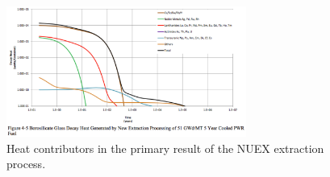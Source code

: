 \begin{figure}[htbp!]
  \begin{center}
    \includegraphics[width=0.7\textwidth]{./images/carter_nuex_heat.eps}
  \end{center}
  \caption{Heat contributors in the primary result of the NUEX extraction 
    process\cite{carter_us_2011}.}
  \label{fig:carter_nuex_heat}
\end{figure}
